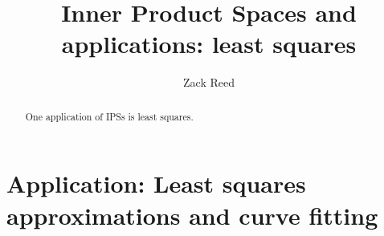 \documentclass{ximera}
\author{Zack Reed}
\title{Inner Product Spaces and applications: least squares}
\begin{document}
\begin{abstract}

    One application of IPSs is least squares.

\end{abstract}
\maketitle


\section{Application: Least squares approximations and curve fitting}
\label{sec:least-squares}

\end{document}
